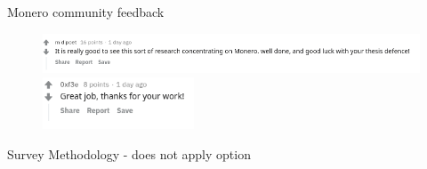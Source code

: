 \documentclass{beamer}
\begin{document}
\begin{darkframes}
    \begin{frame}{Monero community feedback}
     	\begin{figure}
  \centering
  \includegraphics[width=1\textwidth]{reddit-commentnext.png}
  \includegraphics[width=0.4\textwidth]{community-redditcomment.png}
\end{figure}
    \end{frame}
    
\begin{frame}{Survey Methodology - does not apply option}

\color{aquamarine}


\end{frame}
\end{darkframes}
\end{document}
